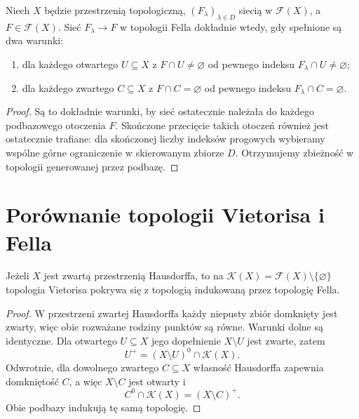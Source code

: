 \begin{stwierdzenie}
\label{prop:topog21-fell-nets}
Niech \(X\) będzie przestrzenią topologiczną,
\((F_\lambda)_{\lambda\in D}\) siecią
w \(\mathcal F(X)\), a \(F\in\mathcal F(X)\).
Sieć \(F_\lambda\to F\) w topologii Fella
dokładnie wtedy, gdy spełnione są dwa warunki:
\begin{enumerate}[label=\textup{(\roman*)}]
\item dla każdego otwartego \(U\subseteq X\)
z \(F\cap U\neq\varnothing\)
od pewnego indeksu \(F_\lambda\cap U\neq\varnothing\);
\item dla każdego zwartego \(C\subseteq X\)
z \(F\cap C=\varnothing\)
od pewnego indeksu \(F_\lambda\cap C=\varnothing\).
\end{enumerate}
\end{stwierdzenie}
\begin{proof}
Są to dokładnie warunki, by sieć ostatecznie
należała do każdego podbazowego otoczenia \(F\).
Skończone przecięcie takich otoczeń
również jest ostatecznie trafiane:
dla skończonej liczby indeksów progowych
wybieramy wspólne górne ograniczenie
w skierowanym zbiorze \(D\).
Otrzymujemy zbieżność w topologii
generowanej przez podbazę.
\end{proof}

\section{Porównanie topologii Vietorisa i Fella}
\label{sec:topog21-comparison}

\begin{twierdzenie}
\label{thm:topog21-fell-vietoris}
Jeżeli \(X\) jest zwartą przestrzenią Hausdorffa,
to na \(\mathcal K(X)=\mathcal F(X)\setminus\{\varnothing\}\)
topologia Vietorisa pokrywa się z topologią
indukowaną przez topologię Fella.
\end{twierdzenie}
\begin{proof}
W przestrzeni zwartej Hausdorffa
każdy niepusty zbiór domknięty jest zwarty,
więc obie rozważane rodziny punktów są równe.
Warunki dolne są identyczne.
Dla otwartego \(U\subseteq X\)
jego dopełnienie \(X\setminus U\) jest zwarte, zatem
\[
 U^+=(X\setminus U)^0
          \cap\mathcal K(X).
\]
Odwrotnie, dla dowolnego zwartego \(C\subseteq X\)
własność Hausdorffa zapewnia domkniętość \(C\),
a więc \(X\setminus C\) jest otwarty i
\[
 C^0\cap\mathcal K(X)=(X\setminus C)^+.
\]
Obie podbazy indukują tę samą topologię.
\end{proof}

